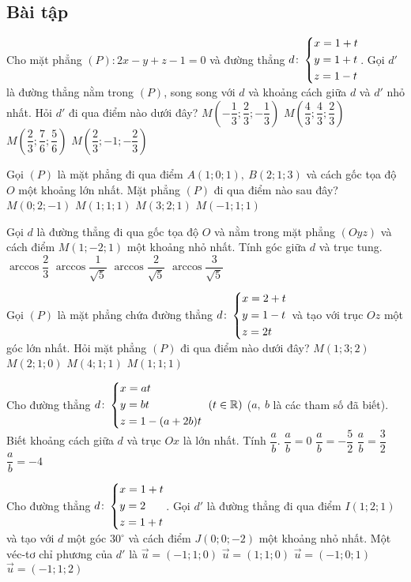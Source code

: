\subsection{Bài tập}
\begin{ex}%
Cho mặt phẳng $(P)\colon2x-y+z-1=0$ và đường thẳng $d\colon\left\{\begin{aligned}&x=1+t\\&y=1+t\\&z=1-t\end{aligned}\right.$. Gọi $d'$ là đường thẳng nằm trong $(P)$, song song với $d$ và khoảng cách giữa $d$ và $d'$ nhỏ nhất. Hỏi $d'$ đi qua điểm nào dưới đây?
\choice
{$M\left(-\dfrac{1}{3};\dfrac{2}{3};-\dfrac{1}{3}\right)$}
{$M\left(\dfrac{4}{3};\dfrac{4}{3};\dfrac{2}{3}\right)$}
{$M\left(\dfrac{2}{3};\dfrac{7}{6};\dfrac{5}{6}\right)$}
{$M\left(\dfrac{2}{3};-1;-\dfrac{2}{3}\right)$}
\end{ex}
\begin{ex}%
Gọi $(P)$ là mặt phẳng đi qua điểm $A(1;0;1),~B(2;1;3)$ và cách gốc tọa độ $O$ một khoảng lớn nhất. Mặt phẳng $(P)$ đi qua điểm nào sau đây?
\choice
{$M(0;2;-1)$}
{$M(1;1;1)$}
{$M(3;2;1)$}
{$M(-1;1;1)$}
\end{ex}
\begin{ex}%
Gọi $d$ là đường thẳng đi qua gốc tọa độ $O$ và nằm trong mặt phẳng $(Oyz)$ và cách điểm $M(1;-2;1)$ một khoảng nhỏ nhất. Tính góc giữa $d$ và trục tung.
\choice
{$\arccos\dfrac{2}{3}$}
{$\arccos\dfrac{1}{\sqrt{5}}$}
{$\arccos\dfrac{2}{\sqrt{5}}$}
{$\arccos\dfrac{3}{\sqrt{5}}$}
\end{ex}
\begin{ex}%
Gọi $(P)$ là mặt phẳng chứa đường thẳng $d\colon\left\{\begin{aligned}&x=2+t\\&y=1-t\\&z=2t\end{aligned}\right.$ và tạo với trục $Oz$ một góc lớn nhất. Hỏi mặt phẳng $(P)$ đi qua điểm nào dưới đây?
\choice
{$M(1;3;2)$}
{$M(2;1;0)$}
{$M(4;1;1)$}
{$M(1;1;1)$}
\end{ex}
\begin{ex}%
Cho đường thẳng $d\colon\left\{\begin{aligned}&x=at\\&y=bt\\&z=1-(a+2b)t\end{aligned}\right.~(t\in\mathbb{R})$ ($a,~b$ là các tham số đã biết). Biết khoảng cách giữa $d$ và trục $Ox$ là lớn nhất. Tính $\dfrac{a}{b}$.
\choice
{$\dfrac{a}{b}=0$}
{$\dfrac{a}{b}=-\dfrac{5}{2}$}
{$\dfrac{a}{b}=\dfrac{3}{2}$}
{$\dfrac{a}{b}=-4$}
\end{ex}
\begin{ex}%
Cho đường thẳng $d\colon\left\{\begin{aligned}&x=1+t\\&y=2\\&z=1+t\end{aligned}\right.$. Gọi $d'$ là đường thẳng đi qua điểm $I(1;2;1)$ và tạo với $d$ một góc $30^\circ$ và cách điểm $J(0;0;-2)$ một khoảng nhỏ nhất. Một véc-tơ chỉ phương của $d'$ là
\choice
{$\vec{u}=(-1;1;0)$}
{$\vec{u}=(1;1;0)$}
{$\vec{u}=(-1;0;1)$}
{$\vec{u}=(-1;1;2)$}
\end{ex}
